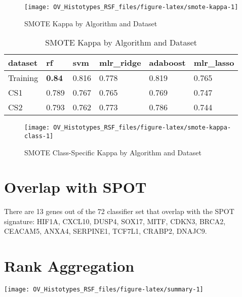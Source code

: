 \documentclass[
]{report}
\begin{document}
\begin{figure}[H]

{\centering \texttt{[image: OV\_Histotypes\_RSF\_files/figure-latex/smote-kappa-1]} 

}

\caption{SMOTE Kappa by Algorithm and Dataset}\label{fig:smote-kappa}
\end{figure}

\begin{table}

\caption{\label{tab:smote-kappa-table}SMOTE Kappa by Algorithm and Dataset}
\centering
\begin{tabular}[t]{l|l|l|l|l|l}
\hline
dataset & rf & svm & mlr\_ridge & adaboost & mlr\_lasso\\
\hline
Training & \textbf{0.84} & 0.816 & 0.778 & 0.819 & 0.765\\
\hline
CS1 & 0.789 & 0.767 & 0.765 & 0.769 & 0.747\\
\hline
CS2 & 0.793 & 0.762 & 0.773 & 0.786 & 0.744\\
\hline
\end{tabular}
\end{table}

\begin{figure}[H]

{\centering \texttt{[image: OV\_Histotypes\_RSF\_files/figure-latex/smote-kappa-class-1]} 

}

\caption{SMOTE Class-Specific Kappa by Algorithm and Dataset}\label{fig:smote-kappa-class}
\end{figure}

\hypertarget{overlap-with-spot}{%
\section{Overlap with SPOT}\label{overlap-with-spot}}

There are 13 genes out of the 72 classifier set that overlap with the SPOT signature: HIF1A, CXCL10, DUSP4, SOX17, MITF, CDKN3, BRCA2, CEACAM5, ANXA4, SERPINE1, TCF7L1, CRABP2, DNAJC9.

\hypertarget{rank-aggregation}{%
\section{Rank Aggregation}\label{rank-aggregation}}

\begin{center}\texttt{[image: OV\_Histotypes\_RSF\_files/figure-latex/summary-1]} \end{center}
\end{document}
